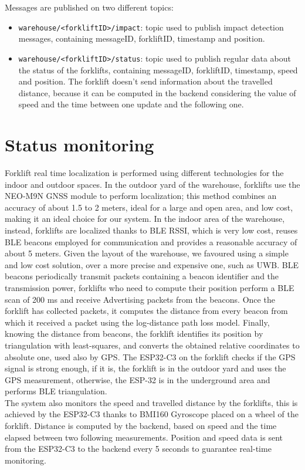 Messages are published on two different topics:
\begin{itemize}
\item \verb|warehouse/<forkliftID>/impact|: topic used to publish impact detection messages, containing messageID, forkliftID, timestamp and position.
\item \verb|warehouse/<forkliftID>/status|: topic used to publish regular data about the status of the forklifts, containing messageID, forkliftID, timestamp, speed and position.
The forklift doesn’t send information about the travelled distance, because it can be computed in the backend considering the value of speed and the time between one update and the following one.
\end{itemize}

\section{Status monitoring}
Forklift real time localization is performed using different technologies for the indoor and outdoor spaces. In the outdoor yard of the warehouse, forklifts use the NEO-M9N GNSS module to perform localization; this method combines an accuracy of about 1.5 to 2 meters, ideal for a large and open area, and low cost, making it an ideal choice for our system. In the indoor area of the warehouse, instead, forklifts are localized thanks to BLE RSSI, which is very low cost, reuses BLE beacons employed for communication and provides a reasonable accuracy of about 5 meters. Given the layout of the warehouse, we favoured using a simple and low cost solution, over a more precise and expensive one, such as UWB. BLE beacons periodically transmit packets containing a beacon identifier and the transmission power, forklifts who need to compute their position perform a BLE scan of 200 ms and receive Advertising packets from the beacons. Once the forklift has collected packets, it computes the distance from every beacon from which it received a packet using the log-distance path loss model. Finally, knowing the distance from beacons, the forklift identifies its position by triangulation with least-squares, and converts the obtained relative coordinates to absolute one, used also by GPS. The ESP32-C3 on the forklift checks if the GPS signal is strong enough, if it is, the forklift is in the outdoor yard and uses the GPS measurement, otherwise, the ESP-32 is in the underground area and performs BLE triangulation.\\ 
The system also monitors the speed and travelled distance by the forklifts, this is achieved by the ESP32-C3 thanks to BMI160 Gyroscope placed on a wheel of the forklift. Distance is computed by the backend, based on speed and the time elapsed between two following measurements. Position and speed data is sent from the ESP32-C3 to the backend every 5 seconds to guarantee real-time monitoring.

